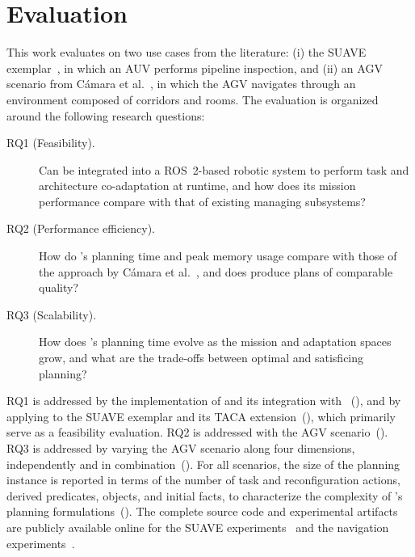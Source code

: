 \section{Evaluation}\label{planta:sec:evaluation}

This work evaluates \planta on two use cases from the literature: (i) the SUAVE exemplar~\cite{suave}, in which an AUV performs pipeline inspection, and (ii) an AGV scenario from Cámara et al.~\cite{CAMARASoftwareArchitectureTask2020}, in which the AGV navigates through an environment composed of corridors and rooms. The evaluation is organized around the following research questions:
\begin{description}
    \item[RQ1 (Feasibility).] Can \planta be integrated into a ROS~2-based robotic system to perform task and architecture co-adaptation at runtime, and how does its mission performance compare with that of existing managing subsystems?
    \item[RQ2 (Performance efficiency).] How do \planta's planning time and peak memory usage compare with those of the approach by Cámara et al.~\cite{CAMARASoftwareArchitectureTask2020}, and does \planta produce plans of comparable quality?
    \item[RQ3 (Scalability).] How does \planta's planning time evolve as the mission and adaptation spaces grow, and what are the trade-offs between optimal and satisficing planning?
\end{description}
RQ1 is addressed by the implementation of \planta and its integration with \plansys~(), and by applying \planta to the SUAVE exemplar and its TACA extension~(), which primarily serve as a feasibility evaluation. RQ2 is addressed with the AGV scenario~(). RQ3 is addressed by varying the AGV scenario along four dimensions, independently and in combination~(). For all scenarios, the size of the planning instance is reported in terms of the number of task and reconfiguration actions, derived predicates, objects, and initial facts, to characterize the complexity of \planta's planning formulations~(). The complete source code and experimental artifacts are publicly available online for the SUAVE experiments~\cite{gustavo_rezende_2026_23619542} and the navigation experiments~\cite{gustavo_rezende_2026_23647225}.

